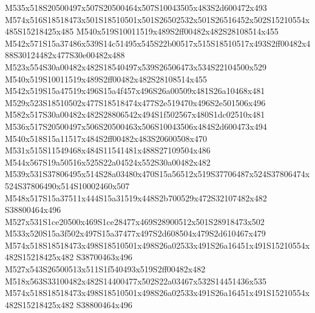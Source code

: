 \documentclass{article}
\begin{document}
\begin{multicols}{2}



M535x518S20500497x507S20500464x507S10043505x483S2d600472x493 M574x516S18518473x501S18510501x501S26502532x501S26516452x502S15210554x485S15218425x485 M540x519S10011519x489S2ff00482x482S28108514x455 M542x571S15a37486x539S14c51495x545S22b00517x515S18510517x493S2ff00482x488S30124482x477S30e00482x488 M523x554S30a00482x482S18540497x539S26506473x534S22104500x529 M540x519S10011519x489S2ff00482x482S28108514x455 M542x519S15a47519x496S15a4f457x496S26a00509x481S26a10468x481 M529x523S18510502x477S18518474x477S2e519470x496S2e501506x496 M582x517S30a00482x482S28806542x494S1f502567x480S1dc02510x481 M536x517S20500497x506S20500463x506S10043506x484S2d600473x494 M540x518S15a11517x484S2ff00482x483S20600508x470 M531x515S11549468x484S11541481x488S27109504x486 M544x567S19a50516x525S22a04524x552S30a00482x482 M539x531S37806495x514S28a03480x470S15a56512x519S37706487x524S37806474x524S37806490x514S10002460x507 M548x517S15a37511x444S15a31519x448S2b700529x472S32107482x482 S38800464x496 M527x531S1ce20500x469S1ce28477x469S28900512x501S28918473x502 M533x520S15a3f502x497S15a37477x497S2d608504x479S2d610467x479 M574x518S18518473x498S18510501x498S26a02533x491S26a16451x491S15210554x482S15218425x482 S38700463x496 M527x543S26500513x511S1f540493x519S2ff00482x482 M518x563S33100482x482S14400477x502S22a03467x532S14451436x535 M574x518S18518473x498S18510501x498S26a02533x491S26a16451x491S15210554x482S15218425x482 S38800464x496





\end{multicols}
\end{document}
